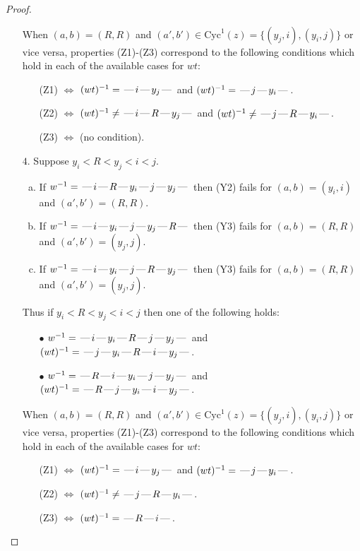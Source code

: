 \documentclass[10pt]{article}
\theoremstyle{definition}
\theoremstyle{definition}
\def\dash{\text{\hspace{0.5mm}---\hspace{0.5mm}}}
\def\Cyc{\mathrm{Cyc}}
\begin{document}
\begin{proof}
\begin{enumerate}
\begin{enumerate}
\end{enumerate}
When $(a,b)= (R,R)$ and $(a',b')\in \Cyc^1(z)=\{(y_j,i),(y_i,j)\}$ or vice versa,
properties (Z1)-(Z3) correspond to the following conditions which
hold in each of the available cases for $wt$:
\begin{enumerate}
\item[](Z1) $\Leftrightarrow$ $(wt)^{-1} = \dash i \dash y_j \dash$  and $(wt)^{-1} = \dash j \dash y_i \dash$.
\item[](Z2) $\Leftrightarrow$ $(wt)^{-1} \neq \dash i \dash R \dash y_j \dash$  and $(wt)^{-1} \neq \dash j \dash R \dash y_i \dash$.
\item[](Z3) $\Leftrightarrow$ (no condition).
\end{enumerate}
\item[$4$.] Suppose $y_i < R < y_j < i < j$.
\begin{enumerate}[(a)]
\item If $w^{-1} = \dash i\dash R\dash y_i\dash j\dash y_j\dash $ then (Y2) fails for $(a,b)=(y_i,i)$ and $(a',b')=(R,R)$.
\item If $w^{-1} = \dash i\dash y_i\dash j\dash y_j\dash R\dash $ then (Y3) fails for $(a,b)=(R,R)$ and $(a',b')=(y_j,j)$.
\item If $w^{-1} = \dash i\dash y_i\dash j\dash R\dash y_j\dash $ then (Y3) fails for $(a,b)=(R,R)$ and $(a',b')=(y_j,j)$.
\end{enumerate}
Thus if $y_i < R < y_j < i < j$ then one of the following holds:
\begin{enumerate}
\item[$\bullet$] $w^{-1} = \dash i\dash y_i\dash R\dash j\dash y_j\dash $ and $(wt)^{-1} = \dash j\dash y_i\dash R\dash i\dash y_j\dash $.
\item[$\bullet$] $w^{-1} = \dash R\dash i\dash y_i\dash j\dash y_j\dash $ and $(wt)^{-1} = \dash R\dash j\dash y_i\dash i\dash y_j\dash $.
\end{enumerate}
When $(a,b)= (R,R)$ and $(a',b')\in \Cyc^1(z)=\{(y_j,i),(y_i,j)\}$ or vice versa,
properties (Z1)-(Z3) correspond to the following conditions which
hold in each of the available cases for $wt$:
\begin{enumerate}
\item[](Z1) $\Leftrightarrow$ $(wt)^{-1} = \dash i \dash y_j \dash$  and $(wt)^{-1} = \dash j \dash y_i \dash$.
\item[](Z2) $\Leftrightarrow$ $(wt)^{-1} \neq \dash j \dash R \dash y_i \dash$.
\item[](Z3) $\Leftrightarrow$ $(wt)^{-1} = \dash R \dash i \dash$.

\end{enumerate}
\end{enumerate}
\end{proof}
\end{document}
